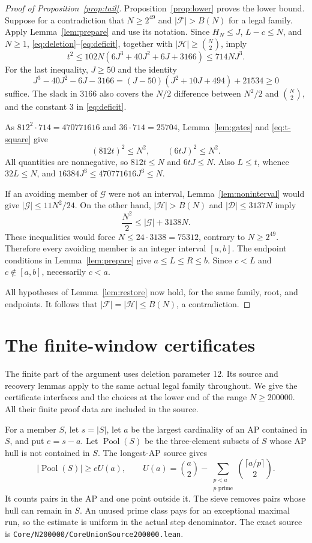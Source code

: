 \documentclass[11pt,a4paper]{article}
\theoremstyle{definition}\newtheorem{definition}[theorem]{Definition}
\newcommand{\F}{\mathcal F}
\newcommand{\G}{\mathcal G}
\newcommand{\D}{\mathcal D}
\newcommand{\Hh}{\mathcal H}
\newcommand{\code}[1]{{\small\nolinkurl{#1}}}
\begin{document}
\begin{proof}[Proof of Proposition~\ref{prop:tail}]
Proposition~\ref{prop:lower} proves the lower bound. Suppose for a
contradiction that $N\ge2^{49}$ and $|\F|>B(N)$ for a legal family.
Apply Lemma~\ref{lem:prepare} and use its notation. Since $H_N\le J$,
$L-c\le N$, and $N\ge1$, \eqref{eq:deletion}--\eqref{eq:deficit}, together
with $|\Hh|\ge\binom N2$, imply
\begin{equation}\label{eq:t-square}
 t^2\le102N(6J^3+40J^2+6J+3166)\le714NJ^3.
\end{equation}
For the last inequality, $J\ge50$ and the identity
\[
 J^3-40J^2-6J-3166
 =(J-50)(J^2+10J+494)+21534\ge0
\]
suffice. The slack in $3166$ also covers the $N/2$ difference between
$N^2/2$ and $\binom N2$, and the constant $3$ in \eqref{eq:deficit}.

As $812^2\cdot714=470771616$ and $36\cdot714=25704$,
Lemma~\ref{lem:gates} and \eqref{eq:t-square} give
\[
 (812t)^2\le N^2,\qquad(6tJ)^2\le N^2.
\]
All quantities are nonnegative, so $812t\le N$ and $6tJ\le N$.
Also $L\le t$, whence $32L\le N$, and
$16384J^3\le470771616J^3\le N$.

If an avoiding member of $\G$ were not an interval,
Lemma~\ref{lem:noninterval} would give $|\G|\le11N^2/24$.
On the other hand, $|\Hh|>B(N)$ and $|\D|\le3137N$ imply
\[
 \frac{N^2}{2}\le |\G|+3138N.
\]
These inequalities would force $N\le24\cdot3138=75312$, contrary to
$N\ge2^{49}$. Therefore every avoiding member is an integer interval
$[a,b]$. The endpoint conditions in Lemma~\ref{lem:prepare} give
$a\le L\le R\le b$. Since $c<L$ and $c\notin[a,b]$, necessarily
$c<a$.

All hypotheses of Lemma~\ref{lem:restore} now hold, for the same
family, root, and endpoints. It follows that
$|\F|=|\Hh|\le B(N)$, a contradiction.
\end{proof}

\section{The finite-window certificates}\label{sec:finite}
The finite part of the argument uses deletion parameter 12. Its source
and recovery lemmas apply to the same actual legal family throughout.
We give the certificate interfaces and the choices at the lower end of
the range $N\ge200000$. All their finite proof data are included in the source.

For a member $S$, let $s=|S|$, let $a$ be the largest cardinality of an AP
contained in $S$, and put $e=s-a$. Let $\operatorname{Pool}(S)$ be the
three-element subsets of $S$ whose AP hull is not contained in $S$.
The longest-AP source gives
\[
 |\operatorname{Pool}(S)|\ge eU(a),\qquad
 U(a)=\binom a2-
 \sum_{\substack{p<a\\p\text{ prime}}}\binom{\lceil a/p\rceil}{2}.
\]
It counts pairs in the AP and one point outside it. The sieve removes
pairs whose hull can remain in $S$. An unused prime class pays for an
exceptional maximal run, so the estimate is uniform in the actual step
denominator. The exact source is
\code{Core/N200000/CoreUnionSource200000.lean}.
\end{document}
